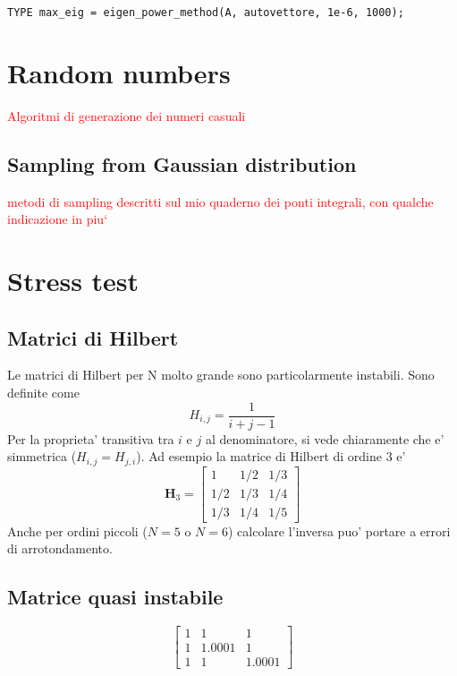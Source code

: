 \documentclass[10pt]{article}
\begin{document}
\texttt{TYPE max\_eig = eigen\_power\_method(A, autovettore, 1e-6, 1000);}






\newpage

\appendix

\section{Random numbers}

\textcolor{red}{Algoritmi di generazione dei numeri casuali}

\subsection{Sampling from Gaussian distribution}

\textcolor{red}{metodi di sampling descritti sul mio quaderno dei ponti integrali, con qualche indicazione in piu`}


\section{Stress test}



\subsection{Matrici di Hilbert}

Le matrici di Hilbert per N molto grande sono particolarmente instabili.
Sono definite come
\begin{equation}
H_{i,j} = \frac{1}{i+j-1}
\end{equation}
Per la proprieta' transitiva tra $i$ e $j$ al denominatore, si vede chiaramente che e' simmetrica ($H_{i,j}=H_{j,i}$).
Ad esempio la matrice di Hilbert di ordine 3 e'
$$
\mathbf{H}_3 =
\begin{bmatrix}
1   & 1/2 & 1/3 \\
1/2 & 1/3 & 1/4 \\
1/3 & 1/4 & 1/5
\end{bmatrix}
$$
Anche per ordini piccoli ($N=5$ o $N=6$) calcolare l'inversa puo' portare a errori di arrotondamento.


\subsection{Matrice quasi instabile}

$$
\begin{bmatrix}
1 & 1 & 1 \\ 1 & 1.0001 & 1 \\ 1 & 1 & 1.0001
\end{bmatrix}
$$
\end{document}
